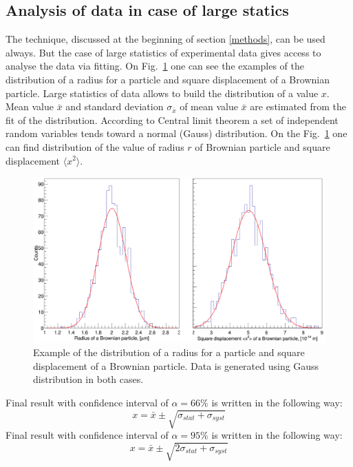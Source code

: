 \documentclass[12pt,a4paper]{report}
\begin{document}
\subsection{Analysis of data in case of large statics}
The technique, discussed at the beginning of section \ref{methods}, can be used always. But the case of large statistics of experimental data gives access to analyse the data via fitting. On Fig.~\ref{fig:radius_distribution} one can see the examples of the distribution of a radius for a particle and square displacement of a Brownian particle. Large statistics of data allows to build the distribution of a value $x$. Mean value $\bar{x}$ and standard deviation $\sigma_{\bar{x}}$ of mean value $\bar{x}$ are estimated from the fit of the distribution. According to Central limit theorem a set of independent random variables tends toward a normal (Gauss) distribution. On the Fig.~\ref{fig:radius_distribution} one can find distribution of the value of radius $r$ of Brownian particle and square displacement $\langle x^2 \rangle$.
\begin{figure}[!h]
\begin{center}
\includegraphics*[scale = 0.25]{Figures/two_plots}
\caption{\label{fig:radius_distribution} Example of the distribution of a radius for a particle and square displacement of a Brownian particle. Data is generated using Gauss distribution in both cases.}
\end{center}
\end{figure}
Final result with confidence interval of $\alpha = 66 \%$ is written in the following way:
\begin{equation}
x = \bar{x} \pm \sqrt{\sigma_{stat}+\sigma_{syst}}
\end{equation}
Final result with confidence interval of $\alpha = 95 \%$ is written in the following way:
\begin{equation} \label{error_offline}
x = \bar{x} \pm \sqrt{2\sigma_{stat}+\sigma_{syst}}
\end{equation}
\end{document}
